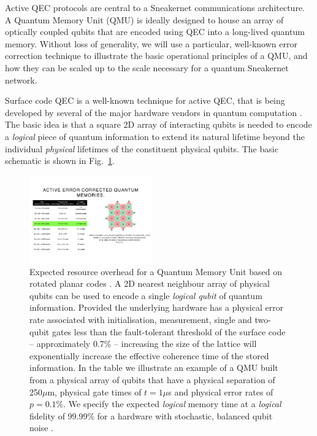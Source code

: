 \documentclass[twocolumn, aps, rmp, amsmath, amssymb, nofootinbib, superscriptaddress, longbibliography, floatfix, table-of-contents, eqsecnum]{revtex4-2}
\newcommand{\comment}[1]{{\color{blue}{\textbf{#1}}}}
\begin{document}
Active QEC protocols are central to a Sneakernet communications architecture. A Quantum Memory Unit (QMU) is ideally designed to house an array of optically coupled qubits that are encoded using QEC into a long-lived quantum memory. Without loss of generality, we will use a particular, well-known error correction technique to illustrate the basic operational principles of a QMU, and how they can be scaled up to the scale necessary for a quantum Sneakernet network.

\comment{Peter up to here}

Surface code QEC is a well-known technique for active QEC, that is being developed by several of the major hardware vendors in quantum computation \cite{SD-Fowler:2012aa}. The basic idea is that a square 2D array of interacting qubits is needed to encode a \textit{logical} piece of quantum information to extend its natural lifetime beyond the individual \textit{physical} lifetimes of the constituent physical qubits. The basic schematic is shown in Fig.~\ref{fig:array}. 

\begin{figure}[htbp!]
	\includegraphics[clip=true, width=0.475\textwidth]{array}
	\caption{Expected resource overhead for a Quantum Memory Unit based on rotated planar codes \cite{SD-Horsman:2012aa}. A 2D nearest neighbour array of physical qubits can be used to encode a single {\em logical qubit} of quantum information. Provided the underlying hardware has a physical error rate associated with initialisation, measurement, single and two-qubit gates less than the fault-tolerant threshold of the surface code -- approximately 0.7\% -- increasing the size of the lattice will exponentially increase the effective coherence time of the stored information.  In the table we illustrate an example of a QMU built from a physical array of qubits that have a physical separation of 250$\mu$m, physical gate times of $t=1\mu$s and physical error rates of $p=0.1\%$. We specify the expected {\em logical} memory time at a {\em logical} fidelity of 99.99\% for a hardware with stochastic, balanced qubit noise \cite{SD-Devitt:2016aa}.} 
	\label{fig:array}
\end{figure}
\end{document}

